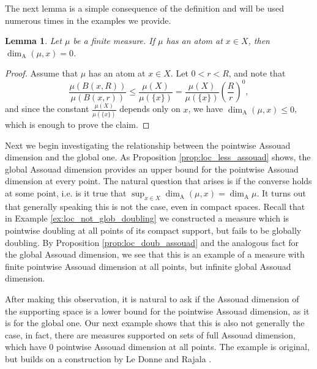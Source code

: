 \documentclass{PRM}
\newcommand{\adim}{\dim_{\mathrm{A}}}
\theoremstyle{plain}
\newtheorem{lemma}[thm]{Lemma}
\theoremstyle{definition}
\theoremstyle{remark}
\begin{document}
The next lemma is a simple consequence of the definition and will be used numerous times in the examples we provide.

\begin{lemma}\label{lemma:atom}
Let $\mu$ be a finite measure. If $\mu$ has an atom at $x\in X$, then $\dim_{\mathrm{A}}(\mu,x)=0$.
\end{lemma}
\begin{proof}
Assume that $\mu$ has an atom at $x\in X$. Let $0<r<R$, and note that
\begin{equation*}
    \frac{\mu(B(x,R))}{\mu(B(x,r))}\leq \frac{\mu(X)}{\mu(\{x\})}=\frac{\mu(X)}{\mu(\{x\})}\left(\frac{R}{r}\right)^0,
\end{equation*}
and since the constant $\frac{\mu(X)}{\mu(\{x\})}$ depends only on $x$, we have $\dim_{\mathrm{A}}(\mu,x)\leq 0$, which is enough to prove the claim.
\end{proof}

Next we begin investigating the relationship between the pointwise Assouad dimension and the global one. As Proposition \ref{prop:loc_less_assouad} shows, the global Assouad dimension provides an upper bound for the pointwise Assouad dimension at every point. The natural question that arises is if the converse holds at some point, i.e. is it true that $\sup_{x\in X}\adim(\mu,x)=\adim\mu$. It turns out that generally speaking this is not the case, even in compact spaces. Recall that in Example \ref{ex:loc_not_glob_doubling}  we constructed a measure which is pointwise doubling at all points of its compact support, but fails to be globally doubling. By Proposition \ref{prop:loc_doub_assouad} and the analogous fact for the global Assouad dimension, we see that this is an example of a measure with finite pointwise Assouad dimension at all points, but infinite global Assouad dimension.

After making this observation, it is natural to ask if the Assouad dimension of the supporting space is a lower bound for the pointwise Assouad dimension, as it is for the global one. Our next example shows that this is also not generally the case, in fact, there are measures supported on sets of full Assouad dimension, which have $0$ pointwise Assouad dimension at all points. The example is original, but builds on a construction by Le Donne and Rajala \cite[Example 2.20]{LR}.
\end{document}
